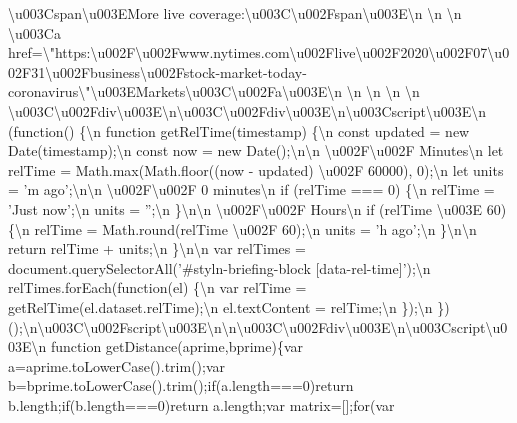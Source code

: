\textbackslash{}u003Cspan\textbackslash{}u003EMore live
coverage:\textbackslash{}u003C\textbackslash{}u002Fspan\textbackslash{}u003E\textbackslash{}n
\textbackslash{}n \textbackslash{}n \textbackslash{}u003Ca
href=\textbackslash{}"https:\textbackslash{}u002F\textbackslash{}u002Fwww.nytimes.com\textbackslash{}u002Flive\textbackslash{}u002F2020\textbackslash{}u002F07\textbackslash{}u002F31\textbackslash{}u002Fbusiness\textbackslash{}u002Fstock-market-today-coronavirus\textbackslash{}"\textbackslash{}u003EMarkets\textbackslash{}u003C\textbackslash{}u002Fa\textbackslash{}u003E\textbackslash{}n
\textbackslash{}n \textbackslash{}n \textbackslash{}n \textbackslash{}n
\textbackslash{}u003C\textbackslash{}u002Fdiv\textbackslash{}u003E\textbackslash{}n\textbackslash{}u003C\textbackslash{}u002Fdiv\textbackslash{}u003E\textbackslash{}n\textbackslash{}u003Cscript\textbackslash{}u003E\textbackslash{}n
(function() \{\textbackslash{}n function getRelTime(timestamp)
\{\textbackslash{}n const updated = new
Date(timestamp);\textbackslash{}n const now = new
Date();\textbackslash{}n\textbackslash{}n
\textbackslash{}u002F\textbackslash{}u002F Minutes\textbackslash{}n let
relTime = Math.max(Math.floor((now - updated) \textbackslash{}u002F
60000), 0);\textbackslash{}n let units = 'm
ago';\textbackslash{}n\textbackslash{}n
\textbackslash{}u002F\textbackslash{}u002F 0 minutes\textbackslash{}n if
(relTime === 0) \{\textbackslash{}n relTime = 'Just
now';\textbackslash{}n units = '';\textbackslash{}n
\}\textbackslash{}n\textbackslash{}n
\textbackslash{}u002F\textbackslash{}u002F Hours\textbackslash{}n if
(relTime \textbackslash{}u003E 60) \{\textbackslash{}n relTime =
Math.round(relTime \textbackslash{}u002F 60);\textbackslash{}n units =
'h ago';\textbackslash{}n \}\textbackslash{}n\textbackslash{}n return
relTime + units;\textbackslash{}n \}\textbackslash{}n\textbackslash{}n
var relTimes = document.querySelectorAll('\#styln-briefing-block
{[}data-rel-time{]}');\textbackslash{}n relTimes.forEach(function(el)
\{\textbackslash{}n var relTime =
getRelTime(el.dataset.relTime);\textbackslash{}n el.textContent =
relTime;\textbackslash{}n \});\textbackslash{}n
\})();\textbackslash{}n\textbackslash{}u003C\textbackslash{}u002Fscript\textbackslash{}u003E\textbackslash{}n\textbackslash{}n\textbackslash{}u003C\textbackslash{}u002Fdiv\textbackslash{}u003E\textbackslash{}n\textbackslash{}u003Cscript\textbackslash{}u003E\textbackslash{}n
function getDistance(aprime,bprime)\{var
a=aprime.toLowerCase().trim();var
b=bprime.toLowerCase().trim();if(a.length===0)return
b.length;if(b.length===0)return a.length;var matrix={[}{]};for(var
